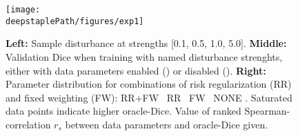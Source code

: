 

    \begin{figure}
        \centering
        \texttt{[image: \\deepstaplePath/figures/exp1]}
        \caption{\textbf{Left:} Sample disturbance  at strengths [0.1, 0.5, 1.0, 5.0]. \textbf{Middle:} Validation Dice when training with named disturbance strenghts, either with data parameters enabled (\sampleline{}) or disabled (). \textbf{Right:} Parameter distribution for combinations of risk regularization (RR) and fixed weighting (FW): RR+FW  \textpipe~RR  \textpipe~FW   \textpipe~NONE . Saturated data points indicate higher oracle-Dice. Value of ranked Spearman-correlation \(r_s\) between data parameters and oracle-Dice given.}
        \label{fig:exp1_deepstaple}
        \vspace{-12pt}
    \end{figure}
    \vspace{-7pt}
